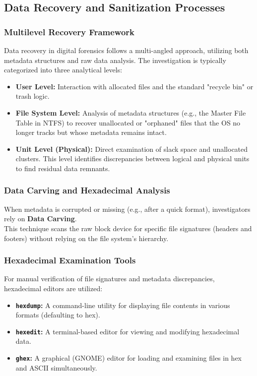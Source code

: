 \subsection{Data Recovery and Sanitization Processes}

\subsubsection{Multilevel Recovery Framework}
Data recovery in digital forensics follows a multi-angled approach, utilizing both metadata structures and raw data analysis. The investigation is typically categorized into three analytical levels:
\begin{itemize}
    \item \textbf{User Level:} Interaction with allocated files and the standard "recycle bin" or trash logic.
    \item \textbf{File System Level:} Analysis of metadata structures (e.g., the Master File Table in NTFS) to recover unallocated or "orphaned" files that the OS no longer tracks but whose metadata remains intact.
    \item \textbf{Unit Level (Physical):} Direct examination of slack space and unallocated clusters. This level identifies discrepancies between logical and physical units to find residual data remnants.
\end{itemize}

\subsubsection{Data Carving and Hexadecimal Analysis}
When metadata is corrupted or missing (e.g., after a quick format), investigators rely on \textbf{Data Carving}.\\
This technique scans the raw block device for specific file signatures (headers and footers) without relying on the file system's hierarchy.

\subsubsection*{Hexadecimal Examination Tools}
For manual verification of file signatures and metadata discrepancies, hexadecimal editors are utilized:
\begin{itemize}
    \item \textbf{\texttt{hexdump}:} A command-line utility for displaying file contents in various formats (defaulting to hex).
    \item \textbf{\texttt{hexedit}:} A terminal-based editor for viewing and modifying hexadecimal data.
    \item \textbf{\texttt{ghex}:} A graphical (GNOME) editor for loading and examining files in hex and ASCII simultaneously.
\end{itemize}


